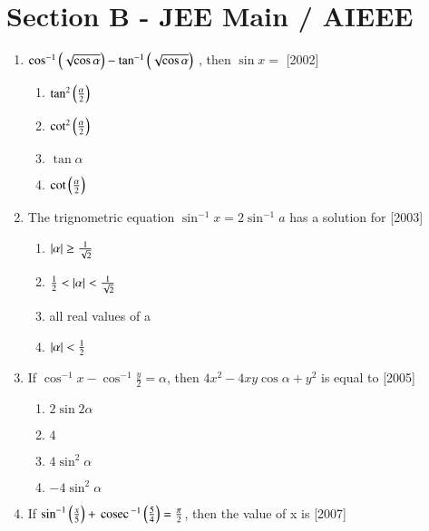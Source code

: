 \documentclass[journal,12pt,twocolumn]{IEEEtran}
\theoremstyle{remark}
\begin{document}
\section*{Section B - JEE Main / AIEEE}
\begin{enumerate}
	\item{
		$\cos^{-1}\left(\sqrt{\cos\alpha}\right)-\tan^{-1}\left(\sqrt{\cos\alpha}\right)$ , then $\sin x =$ \hfill [2002]
		\begin{multicols}{2}
		\begin{enumerate}
			\item{$\tan^2 \left(\frac{\alpha}{2}\right)$}
			\item{$\cot^2 \left(\frac{\alpha}{2}\right)$}
			\columnbreak
			\item{$\tan\alpha$}
			\item{$\cot \left(\frac{\alpha}{2}\right)$}
		\end{enumerate}
		\end{multicols}
	}
	\item{
			The trignometric equation $\sin^{-1} x = 2 \sin^{-1}a$ has a solution for \hfill [2003]
		\begin{multicols}{2}
		\begin{enumerate}
			\item{$\left\vert\alpha\right\vert\geq\frac{1}{\sqrt{2}}$}
			\item{$\frac{1}{2} < \left\vert\alpha\right\vert < \frac{1}{\sqrt{2}}$}
			\columnbreak
			\item{all real values of a}
			\item{$\left\vert\alpha\right\vert < \frac{1}{2}$}
		\end{enumerate}
		\end{multicols}
	}
	\item{
			If $\cos^{-1}x - \cos^{-1}\frac{y}{2} = \alpha$, then $4x^2 - 4xy \cos \alpha + y^2$ is equal to \hfill [2005]
		\begin{multicols}{2}
		\begin{enumerate}
			\item{$2 \sin 2\alpha$}
			\item{$4$}
			\columnbreak
			\item{$4 \sin^2 \alpha$}
			\item{$-4 \sin^2 \alpha$}
		\end{enumerate}
		\end{multicols}
	}
	\item{
			If $\sin^{-1} \left(\frac{x}{5}\right) + \,\text{cosec}\,^{-1}\left(\frac{5}{4}\right) = \frac{\pi}{2}$, then the value of x is \hfill [2007]
		\begin{multicols}{2}

\end{multicols}}
\end{enumerate}
\end{document}
